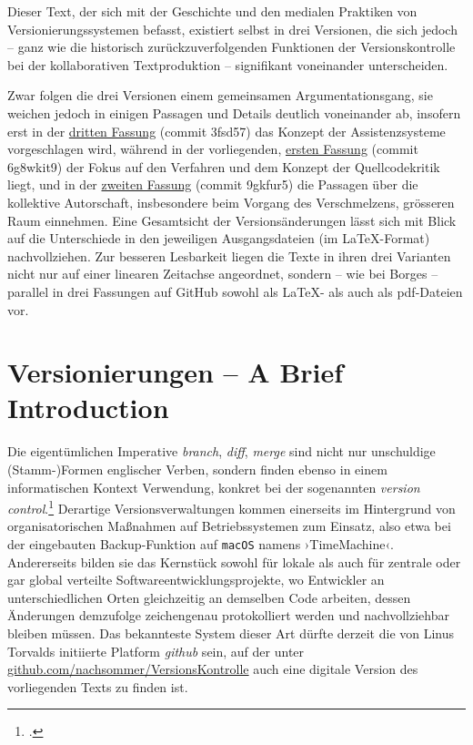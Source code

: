 \documentclass[a4paper,11pt]{article}
\newcommand{\inanf}[1]{›#1‹}
\begin{document}
Dieser Text, der sich mit der Geschichte und den medialen Praktiken von Versionierungssystemen befasst, existiert selbst in drei Versionen, die sich jedoch – ganz wie die historisch zurückzuverfolgenden Funktionen der Versionskontrolle bei der kollaborativen Textproduktion – signifikant voneinander unterscheiden. 

Zwar folgen die drei Versionen einem gemeinsamen Argumentationsgang, sie weichen jedoch in einigen Passagen und Details deutlich voneinander ab, insofern erst in der \href{https://github.com/nachsommer/VersionsKontrolle/tree/master/3.Fassung}{dritten Fassung} (commit 3fsd57) das Konzept der Assistenzsysteme vorgeschlagen wird, während in der vorliegenden, \href{https://github.com/nachsommer/VersionsKontrolle/tree/master/1.Fassung}{ersten Fassung} (commit 6g8wkit9) der Fokus auf den Verfahren und dem Konzept der Quellcodekritik liegt, und in der \href{https://github.com/nachsommer/VersionsKontrolle/tree/master/2.Fassung}{zweiten Fassung} (commit 9gkfur5) die Passagen über die kollektive Autorschaft, insbesondere beim Vorgang des Verschmelzens, grösseren Raum einnehmen. Eine Gesamtsicht der Versionsänderungen lässt sich mit Blick auf die Unterschiede in den jeweiligen Ausgangsdateien (im \LaTeX-Format) nachvollziehen. Zur besseren Lesbarkeit liegen die Texte in ihren drei Varianten nicht nur auf einer linearen Zeitachse angeordnet, sondern – wie bei Borges – parallel in drei Fassungen auf GitHub sowohl als \LaTeX- als auch als pdf-Dateien vor.

\section{Versionierungen – A Brief Introduction}

Die eigentümlichen Imperative \emph{branch}, \emph{diff}, \emph{merge} sind nicht nur unschuldige (Stamm-)Formen englischer Verben, sondern finden ebenso in einem informatischen Kontext Verwendung, konkret bei der sogenannten \emph{version control}.\footcite[Vgl.][]{yuill:2008} Derartige Versionsverwaltungen kommen einerseits im Hintergrund von organisatorischen Maßnahmen auf Betriebssystemen zum Einsatz, also etwa bei der eingebauten Backup-Funktion auf \verb+macOS+ namens \inanf{TimeMachine}. Andererseits bilden sie das Kernstück sowohl für lokale als auch für zentrale oder gar global verteilte Softwareentwicklungsprojekte, wo Entwickler an unterschiedlichen Orten gleichzeitig an demselben Code arbeiten, dessen Änderungen demzufolge zeichengenau protokolliert werden und nachvollziehbar bleiben müssen. Das bekannteste System dieser Art dürfte derzeit die von Linus Torvalds initiierte Platform \emph{github} sein, auf der unter \href{https://github.com/nachsommer/VersionsKontrolle}{github.com/nachsommer/VersionsKontrolle} auch eine digitale Version des vorliegenden Texts zu finden ist. 
\end{document}

